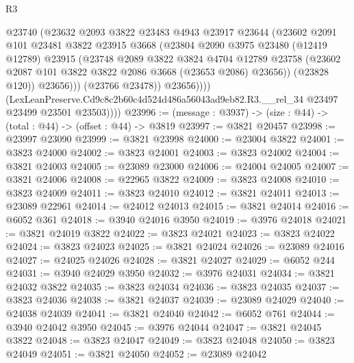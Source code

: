 \begin{lexlean}{R3}
\begin{coremodule}
                      @23740
                      (@23632
                        @2093
                        @3822
                        @23483
                        @4943
                        @23917
                        @23644
                        (@23602
                          @2091
                          @101
                          @23481
                          @3822
                          @23915
                          @3668
                          (@23804
                            @2090
                            @3975
                            @23480
                            (@12419 @12789)
                            @23915
                            (@23748
                              @2089
                              @3822
                              @3824
                              @4704
                              @12789
                              @23758
                              (@23602 @2087 @101 @3822 @3822 @2086 @3668 (@23653 @2086) @23656))
                            (@23828 @120))
                          @23656)))
                    (@23766 @23478))
                  @23656))))
          (LexLeanPreserve.Cd9c8c2b60c4d524d486a56043ad9eb82.R3.__rel_34
            @23497
            @23499
            @23501
            @23503))))
@23996 := (message : @3937) -> (size : @44) -> (total : @44) -> (offset : @44) -> @3819
@23997 := @3821 @20457
@23998 := @23997 @23090
@23999 := @3821 @23998
@24000 := @23004 @3822
@24001 := @3823 @24000
@24002 := @3823 @24001
@24003 := @3823 @24002
@24004 := @3821 @24003
@24005 := @23089 @23000
@24006 := @24004 @24005
@24007 := @3821 @24006
@24008 := @22965 @3822
@24009 := @3823 @24008
@24010 := @3823 @24009
@24011 := @3823 @24010
@24012 := @3821 @24011
@24013 := @23089 @22961
@24014 := @24012 @24013
@24015 := @3821 @24014
@24016 := @6052 @361
@24018 := @3940 @24016 @3950
@24019 := @3976 @24018
@24021 := @3821 @24019 @3822
@24022 := @3823 @24021
@24023 := @3823 @24022
@24024 := @3823 @24023
@24025 := @3821 @24024
@24026 := @23089 @24016
@24027 := @24025 @24026
@24028 := @3821 @24027
@24029 := @6052 @244
@24031 := @3940 @24029 @3950
@24032 := @3976 @24031
@24034 := @3821 @24032 @3822
@24035 := @3823 @24034
@24036 := @3823 @24035
@24037 := @3823 @24036
@24038 := @3821 @24037
@24039 := @23089 @24029
@24040 := @24038 @24039
@24041 := @3821 @24040
@24042 := @6052 @761
@24044 := @3940 @24042 @3950
@24045 := @3976 @24044
@24047 := @3821 @24045 @3822
@24048 := @3823 @24047
@24049 := @3823 @24048
@24050 := @3823 @24049
@24051 := @3821 @24050
@24052 := @23089 @24042

\end{coremodule}
\end{lexlean}
